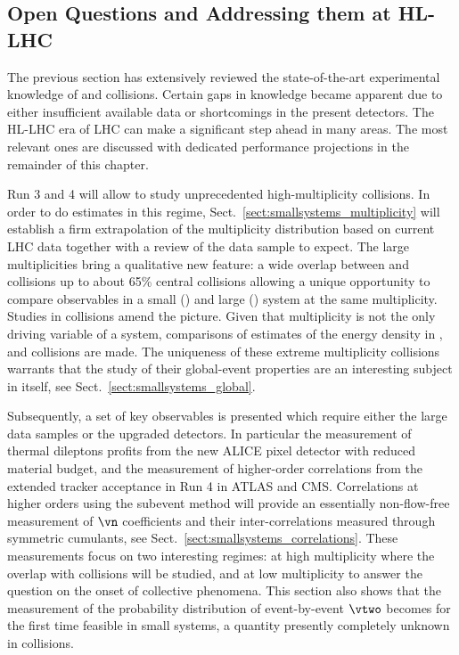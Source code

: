 \documentclass[../report.tex]{subfiles}
\begin{document}
\subsection{Open Questions and Addressing them at HL-LHC}
\label{sect:smallsystems_openquestions}

The previous section has extensively reviewed the state-of-the-art experimental knowledge of \pp and \pPb collisions. Certain gaps in knowledge became apparent due to either insufficient available data or shortcomings in the present detectors. The HL-LHC era of LHC can make a significant step ahead in many areas. The most relevant ones are discussed with dedicated performance projections in the remainder of this chapter.

Run 3 and 4 will allow to study unprecedented high-multiplicity \pp collisions. In order to do estimates in this regime, Sect.~\ref{sect:smallsystems_multiplicity} will establish a firm extrapolation of the multiplicity distribution based on current LHC data together with a review of the data sample to expect. The large multiplicities bring a qualitative new feature: a wide overlap between \pp and \PbPb collisions up to about 65\% central collisions allowing a unique opportunity to compare observables in a small (\pp) and large (\PbPb) system at the same multiplicity. Studies in \pPb collisions amend the picture. Given that multiplicity is not the only driving variable of a system, comparisons of estimates of the energy density in \pp, \pPb and \PbPb collisions are made. The uniqueness of these extreme multiplicity \pp collisions warrants that the study of their global-event properties are an interesting subject in itself, see Sect.~\ref{sect:smallsystems_global}.

Subsequently, a set of key observables is presented which require either the large data samples or the upgraded detectors. In particular the measurement of thermal dileptons profits from the new ALICE pixel detector with reduced material budget, and the measurement of higher-order correlations from the extended tracker acceptance in Run 4 in ATLAS and CMS. Correlations at higher orders using the subevent method will provide an essentially non-flow-free measurement of $\vn$ coefficients and their inter-correlations measured through symmetric cumulants, see Sect.~\ref{sect:smallsystems_correlations}. These measurements focus on two interesting regimes: at high multiplicity where the overlap with \PbPb collisions will be studied, and at low multiplicity to answer the question on the onset of collective phenomena.
This section also shows that the measurement of the probability distribution of event-by-event $\vtwo$ becomes for the first time feasible in small systems, a quantity presently completely unknown in \pp collisions.
\end{document}

